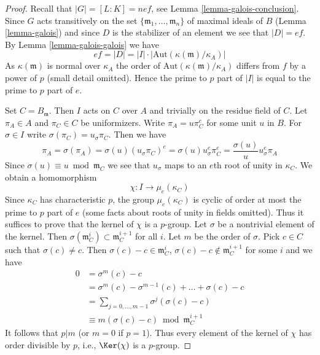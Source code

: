 \begin{proof}
Recall that $|G| = [L : K] = nef$, see Lemma \ref{lemma-galois-conclusion}.
Since $G$ acts transitively on the set
$\{\mathfrak m_1, \ldots, \mathfrak m_n\}$ of maximal ideals of $B$
(Lemma \ref{lemma-galois})
and since $D$ is the stabilizer of an element we see that $|D| = ef$.
By Lemma \ref{lemma-galois-galois} we have
$$
ef = |D| = |I| \cdot |\text{Aut}(\kappa(\mathfrak m)/\kappa_A)|
$$
As $\kappa(\mathfrak m)$ is normal over $\kappa_A$ the order of
$\text{Aut}(\kappa(\mathfrak m)/\kappa_A)$ differs from $f$ by
a power of $p$ (small detail omitted). Hence the prime to $p$ part
of $|I|$ is equal to the prime to $p$ part of $e$.

\medskip\noindent
Set $C = B_\mathfrak m$. Then $I$ acts on $C$ over $A$ and trivially
on the residue field of $C$. Let $\pi_A \in A$ and $\pi_C \in C$ be
uniformizers. Write $\pi_A = u \pi_C^e$ for some unit $u$ in $B$.
For $\sigma \in I$ write $\sigma(\pi_C) = u_\sigma \pi_C$.
Then we have
$$
\pi_A = \sigma(\pi_A) = \sigma(u) (u_\sigma \pi_C)^e
= \sigma(u) u_\sigma^e \pi_C^e = \frac{\sigma(u)}{u} u_\sigma^e \pi_A
$$
Since $\sigma(u) \equiv u \bmod \mathfrak m_C$ we see that $u_\sigma$
maps to an $e$th root of unity in $\kappa_C$. We obtain a homomorphism
$$
\chi : I \longrightarrow \mu_e(\kappa_C)
$$
Since $\kappa_C$ has characteristic $p$, the group $\mu_e(\kappa_C)$
is cyclic of order at most the prime to $p$ part of $e$ (some facts about
roots of unity in fields omitted). Thus it suffices to prove that the
kernel of $\chi$ is a $p$-group. Let $\sigma$ be a nontrivial element of
the kernel. Then $\sigma(\mathfrak m_C^i) \subset \mathfrak m_C^{i + 1}$
for all $i$. Let $m$ be the order of $\sigma$. Pick $c \in C$ such
that $\sigma(c) \not = c$. Then $\sigma(c) - c \in \mathfrak m_C^i$,
$\sigma(c) - c \not \in \mathfrak m_C^{i + 1}$ for some $i$ and
we have
\begin{align*}
0
& =
\sigma^m(c) - c \\
& =
\sigma^m(c) - \sigma^{m - 1}(c) + \ldots + \sigma(c) - c \\
& =
\sum\nolimits_{j = 0, \ldots, m - 1} \sigma^j(\sigma(c) - c) \\
& \equiv
m(\sigma(c) - c) \bmod \mathfrak m_C^{i + 1}
\end{align*}
It follows that $p | m$ (or $m = 0$ if $p = 1$). Thus every element of the
kernel of $\chi$ has order divisible by $p$, i.e., $\Ker(\chi)$
is a $p$-group.
\end{proof}

